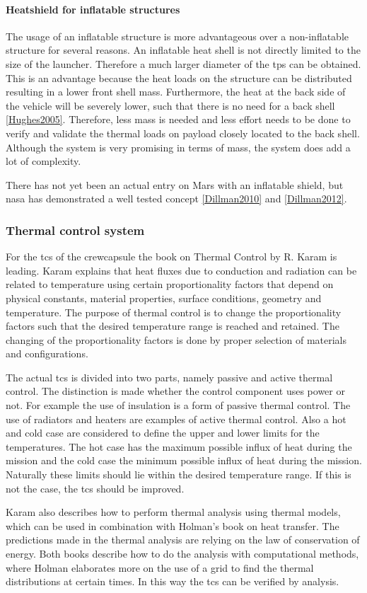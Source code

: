 \paragraph{Heatshield for inflatable structures}
The usage of  an inflatable structure is more advantageous over a non-inflatable structure for several reasons. An inflatable heat shell is not directly limited to the size of the launcher. Therefore a much larger diameter of the \gls{tps} can be obtained. This is an advantage because the heat loads on the structure can be distributed resulting in a lower front shell mass. Furthermore, the heat at the back side of the vehicle will be severely lower, such that there is no need for a back shell \ref{Hughes2005}. Therefore, less mass is needed and less effort needs to be done to verify and validate the thermal loads on payload closely located to the back shell. Although the system is very promising in terms of mass, the system does add a lot of complexity.

There has not yet been an actual entry on Mars with an inflatable shield, but \gls{nasa} has demonstrated a well tested concept \ref{Dillman2010} and \ref{Dillman2012}.

\subsubsection{Thermal control system}
For the \gls{tcs} of the crewcapsule the book on Thermal Control by R. Karam is leading. \cite{Karam1998} Karam explains that heat fluxes due to conduction and radiation can be related to temperature using certain proportionality factors that depend on physical constants, material properties, surface conditions, geometry and temperature. The purpose of thermal control is to change the proportionality factors such that the desired temperature range is reached and retained. The changing of the proportionality factors is done by proper selection of materials and configurations.

The actual \gls{tcs} is divided into two parts, namely passive and active thermal control. The distinction is made whether the control component uses power or not. For example the use of insulation is a form of passive thermal control. The use of radiators and heaters are examples of active thermal control. Also a hot and cold case are considered to define the upper and lower limits for the temperatures. The hot case has the maximum possible influx of heat during the mission and the cold case the minimum possible influx of heat during the mission. Naturally these limits should lie within the desired temperature range. If this is not the case, the \gls{tcs} should be improved.

Karam also describes how to perform thermal analysis using thermal models, which can be used in combination with Holman's book on heat transfer. \cite{Holman2002} The predictions made in the thermal analysis are relying on the law of conservation of energy. Both books describe how to do the analysis with computational methods, where Holman elaborates more on the use of a grid to find the thermal distributions at certain times. In this way the \gls{tcs} can be verified by analysis.





